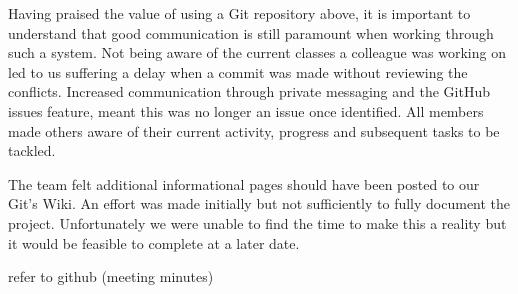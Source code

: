 Having praised the value of using a Git repository above, it is important to understand that good communication is still paramount when working through such a system. Not being aware of the current classes a colleague was working on led to us suffering a delay when a commit was made without reviewing the conflicts. Increased communication through private messaging and the GitHub issues feature, meant this was no longer an issue once identified. All members made others aware of their current activity, progress and subsequent tasks to be tackled.

The team felt additional informational pages should have been posted to our Git's Wiki. An effort was made initially but not sufficiently to fully document the project. Unfortunately we were unable to find the time to make this a reality but it would be feasible to complete at a later date.

\todo refer to github (meeting minutes)
